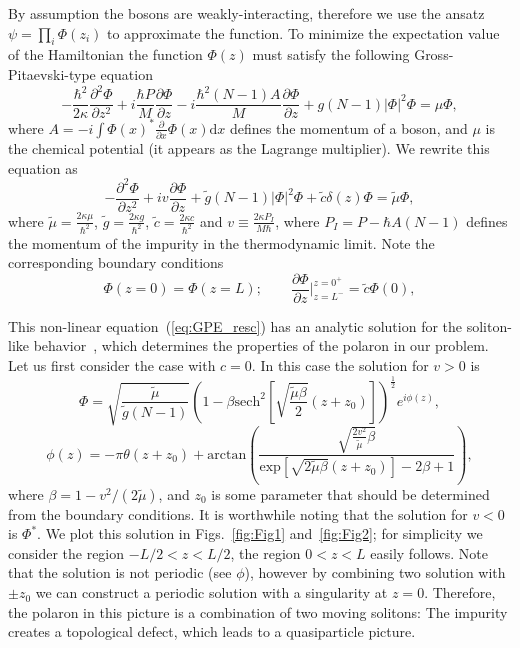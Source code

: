 \documentclass[twocolumn,amsmath,amssymb,showpacs,prl,superscriptaddress,aps]{revtex4-1}
\begin{document}
By assumption the bosons are weakly-interacting, therefore we use the ansatz $\psi=\prod_i \Phi(z_i)$ to approximate the function. 
To minimize the expectation value of the Hamiltonian the function $\Phi(z)$ must satisfy the following Gross-Pitaevski-type equation
\begin{equation}
-\frac{\hbar^2}{2\kappa}\frac{\partial^2\Phi}{\partial z^2}+i\frac{\hbar P}{M}\frac{\partial \Phi}{\partial z}
-i \frac{\hbar^2 (N-1) A}{M} \frac{\partial\Phi}{\partial z} + g(N-1)|\Phi|^2\Phi=\mu \Phi,
\end{equation}
where $A=-i\int \Phi(x)^*\frac{\partial}{\partial x}\Phi(x)\mathrm{d}x$ defines the momentum of a boson, and $\mu$ is the chemical potential (it appears as the Lagrange multiplier). 
We rewrite this equation as
\begin{equation}
-\frac{\partial^2\Phi}{\partial z^2}+i v \frac{\partial \Phi}{\partial z} + \tilde g(N-1)|\Phi|^2\Phi+\tilde c\delta(z)\Phi=\tilde\mu\Phi,
\label{eq:GPE_resc}
\end{equation}
where $\tilde\mu=\frac{2 \kappa \mu}{\hbar^2}$, $\tilde g=\frac{2 \kappa g}{\hbar^2}$, $\tilde c=\frac{2 \kappa c}{\hbar^2}$ and 
$v\equiv \frac{2 \kappa P_I}{M \hbar}$, where $P_I=P-\hbar A(N-1)$ defines the momentum of the impurity in the thermodynamic limit.
Note the corresponding boundary conditions 
\begin{equation}
\Phi(z=0)=\Phi(z=L); \qquad \frac{\partial \Phi}{\partial z}\bigg|^{z=0^+}_{z=L^-}= \tilde c \Phi(0),
\end{equation}



This non-linear equation~(\ref{eq:GPE_resc}) has an analytic solution for the soliton-like behavior~\cite{ishikawa1980,hakim1997}, which determines the properties 
of the polaron in our problem. Let us first consider the case with $c=0$. In this case the solution for $v>0$ is
\begin{equation}
\Phi=\sqrt{\frac{\tilde \mu}{\tilde g(N-1)}}\left(1-\beta \mathrm{sech}^2\left[\sqrt{\frac{\tilde\mu\beta}{2}}(z+z_0)\right]\right)^{\frac{1}{2}}e^{i\phi(z)},
\end{equation}
\begin{equation}
\phi(z)=-\pi\theta(z+z_0)+\mathrm{arctan}\left(\frac{\sqrt{\frac{2 v^2}{\tilde \mu}\beta}}{\mathrm{exp}\left[\sqrt{2\tilde \mu\beta}(z+z_0)\right]-2\beta+1}\right),
\end{equation}
where  $\beta=1- v^2/(2\tilde \mu)$, and $z_0$ is some parameter that should be determined from the boundary conditions. It is worthwhile noting that the solution for $v<0$ is $\Phi^*$. We plot this solution in Figs.~\ref{fig:Fig1} and~\ref{fig:Fig2}; for simplicity we consider the region $-L/2<z<L/2$, the region $0<z<L$ easily follows. Note that the solution is not periodic (see $\phi$), however by combining two solution with $\pm z_0$ 
we can construct a periodic solution with a singularity at $z=0$. Therefore, the polaron in this picture is a combination of two moving solitons: The impurity creates a topological defect, which 
leads to a quasiparticle picture. 
\end{document}
